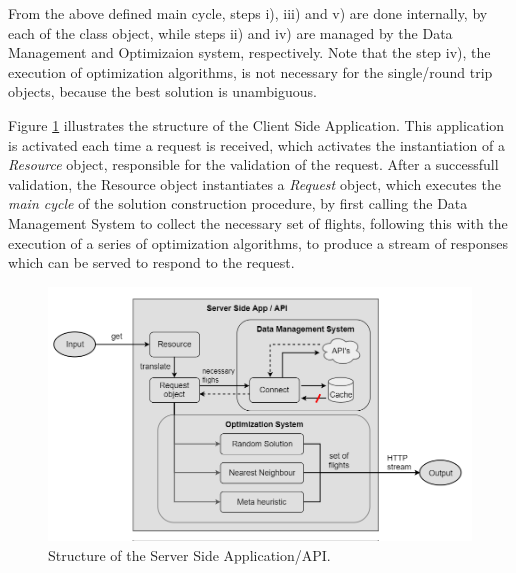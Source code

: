 From the above defined main cycle, steps i), iii) and v) are done internally, by each of the class object,
while steps ii) and iv) are managed by the Data Management and Optimizaion system, respectively.
Note that the step iv), the execution of optimization algorithms, is not necessary for the single/round trip objects,
because the best solution is unambiguous.

Figure \ref{fig:api_structure} illustrates the structure of the Client Side Application.
This application is activated each time a request is received, which activates 
the instantiation of a \textit{Resource} object, responsible for the validation of the request.
After a successfull validation, the Resource object instantiates a \textit{Request} object,
which executes the \textit{main cycle} of the solution construction procedure,
by first calling the Data Management System to collect the necessary set of flights,
following this with the execution of a series of optimization algorithms,
to produce a stream of responses which can be served to respond to the request.

\begin{figure}[htpb]
  \centering
  \includegraphics[width=\textwidth]{./Figures/system_implementation/api_structure.png}
  \caption{Structure of the Server Side Application/API.}
  \label{fig:api_structure}  
\end{figure}